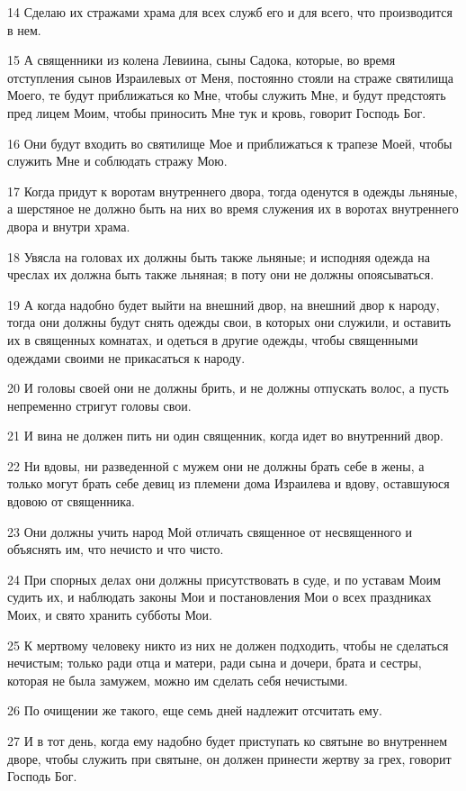 \par 14 Сделаю их стражами храма для всех служб его и для всего, что производится в нем.
\par 15 А священники из колена Левиина, сыны Садока, которые, во время отступления сынов Израилевых от Меня, постоянно стояли на страже святилища Моего, те будут приближаться ко Мне, чтобы служить Мне, и будут предстоять пред лицем Моим, чтобы приносить Мне тук и кровь, говорит Господь Бог.
\par 16 Они будут входить во святилище Мое и приближаться к трапезе Моей, чтобы служить Мне и соблюдать стражу Мою.
\par 17 Когда придут к воротам внутреннего двора, тогда оденутся в одежды льняные, а шерстяное не должно быть на них во время служения их в воротах внутреннего двора и внутри храма.
\par 18 Увясла на головах их должны быть также льняные; и исподняя одежда на чреслах их должна быть также льняная; в поту они не должны опоясываться.
\par 19 А когда надобно будет выйти на внешний двор, на внешний двор к народу, тогда они должны будут снять одежды свои, в которых они служили, и оставить их в священных комнатах, и одеться в другие одежды, чтобы священными одеждами своими не прикасаться к народу.
\par 20 И головы своей они не должны брить, и не должны отпускать волос, а пусть непременно стригут головы свои.
\par 21 И вина не должен пить ни один священник, когда идет во внутренний двор.
\par 22 Ни вдовы, ни разведенной с мужем они не должны брать себе в жены, а только могут брать себе девиц из племени дома Израилева и вдову, оставшуюся вдовою от священника.
\par 23 Они должны учить народ Мой отличать священное от несвященного и объяснять им, что нечисто и что чисто.
\par 24 При спорных делах они должны присутствовать в суде, и по уставам Моим судить их, и наблюдать законы Мои и постановления Мои о всех праздниках Моих, и свято хранить субботы Мои.
\par 25 К мертвому человеку никто из них не должен подходить, чтобы не сделаться нечистым; только ради отца и матери, ради сына и дочери, брата и сестры, которая не была замужем, можно им сделать себя нечистыми.
\par 26 По очищении же такого, еще семь дней надлежит отсчитать ему.
\par 27 И в тот день, когда ему надобно будет приступать ко святыне во внутреннем дворе, чтобы служить при святыне, он должен принести жертву за грех, говорит Господь Бог.
